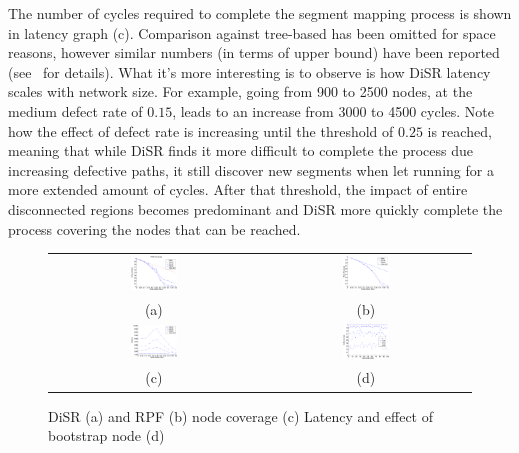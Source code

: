 The number of cycles required to complete the segment mapping
process is shown in latency graph (c). Comparison against tree-based
has been omitted for space reasons, however similar numbers (in terms
of upper bound) have been reported
(see~\cite{Patwardhan05evaluatingthe} for details). What it's more
interesting is to observe is how DiSR latency scales with network
size. For example, going from 900 to 2500 nodes, at the medium defect
rate of $0.15$, leads to an increase from 3000 to 4500 cycles. Note how
the effect of defect rate is increasing until the threshold of $0.25$
is reached, meaning that while DiSR finds it more difficult to
complete the process due increasing defective paths, it still discover
new segments when let running for a more extended amount of cycles.
After that threshold, the impact of entire disconnected regions
becomes predominant and DiSR more quickly complete the process
covering the nodes that can be reached. 

\begin{figure}
\centering
\begin{tabular}{cc}
\includegraphics[width=0.23\textwidth]{pictures/set1.eps} & 
\includegraphics[width=0.23\textwidth]{pictures/coverage.eps} \\
(a) & (b) \\
\includegraphics[width=0.23\textwidth]{pictures/set2.eps} & 
\includegraphics[width=0.23\textwidth]{pictures/set3.eps} \\
(c) & (d)
\end{tabular}
\caption{DiSR (a) and RPF (b) node coverage (c) Latency and effect
of bootstrap node (d)}
\label{fig:results}
\end{figure}

